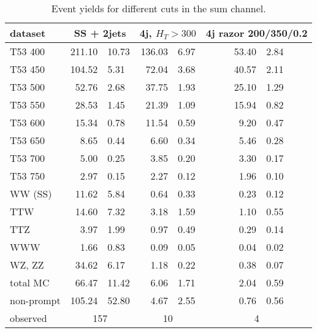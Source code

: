 \begin{table}
    \centering
    \begin{tabular}{l *3{r@{$\pm$}l}}
        \toprule
        dataset & \multicolumn{2}{c}{SS + 2jets}& \multicolumn{2}{c}{4j, $H_T >
        300$}& \multicolumn{2}{c}{4j razor 200/350/0.2} \\
        \midrule
        T53 400& 211.10 & 10.73& 136.03 & 6.97& 53.40 & 2.84\\
        T53 450& 104.52 & 5.31& 72.04 & 3.68& 40.57 & 2.11\\
        T53 500& 52.76 & 2.68& 37.75 & 1.93& 25.10 & 1.29\\
        T53 550& 28.53 & 1.45& 21.39 & 1.09& 15.94 & 0.82\\
        T53 600& 15.34 & 0.78& 11.54 & 0.59& 9.20 & 0.47\\
        T53 650& 8.65 & 0.44& 6.60 & 0.34& 5.46 & 0.28\\
        T53 700& 5.00 & 0.25& 3.85 & 0.20& 3.30 & 0.17\\
        T53 750& 2.97 & 0.15& 2.27 & 0.12& 1.96 & 0.10\\
        WW (SS)& 11.62 & 5.84& 0.64 & 0.33& 0.23 & 0.12\\
        TTW& 14.60 & 7.32& 3.18 & 1.59& 1.10 & 0.55\\
        TTZ& 3.97 & 1.99& 0.97 & 0.49& 0.29 & 0.14\\
        WWW& 1.66 & 0.83& 0.09 & 0.05& 0.04 & 0.02\\
        WZ, ZZ& 34.62 & 6.17& 1.18 & 0.22& 0.38 & 0.07\\
        total MC& 66.47 & 11.42& 6.06 & 1.71& 2.04 & 0.59\\
        non-prompt & 105.24 & 52.80& 4.67 & 2.55& 0.76 & 0.56\\
        observed & \multicolumn{2}{c}{157}& \multicolumn{2}{c}{10}& \multicolumn{2}{c}{4} \\
        \bottomrule
    \end{tabular}
    \caption{Event yields for different cuts in the sum channel.}
\end{table}

